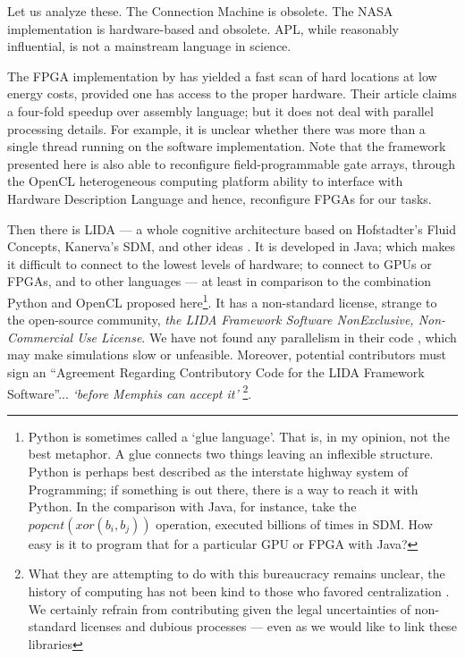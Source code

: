 Let us analyze these.  The Connection Machine is obsolete.  The NASA implementation is hardware-based and obsolete.  APL, while reasonably influential, is not a mainstream language in science.

The FPGA implementation by \citet{silva_reconfigurable_2004} has yielded a fast scan of hard locations at low energy costs, provided one has access to the proper hardware. Their article claims a four-fold speedup over assembly language; but it does not deal with parallel processing details.  For example, it is unclear whether there was more than a single thread running on the software implementation.  Note that the framework presented here is also able to reconfigure field-programmable gate arrays, through the OpenCL heterogeneous computing platform ability to interface with Hardware Description Language and hence, reconfigure FPGAs \citep{waidyasooriya2018design, czajkowski_opencl_2012} for our tasks.

Then there is LIDA --- a whole cognitive architecture based on Hofstadter's Fluid Concepts, Kanerva's SDM, and other ideas \citep{Anwar2003, snaider_integer_2013, snaider_modular_2014, franklin_lida:_2014}.  It is developed in Java; which makes it difficult to connect to the lowest levels of hardware; to connect to GPUs or FPGAs, and to other languages --- at least in comparison to the combination Python and OpenCL proposed here\footnote{Python is sometimes called a `glue language'. That is, in my opinion, not the best metaphor.  A glue connects two things leaving an inflexible structure.  Python is perhaps best described as the interstate highway system of Programming; if something is out there, there is a way to reach it with Python.  In the comparison with Java, for instance, take the $popcnt(xor(b_i,b_j))$ operation, executed billions of times in SDM. How easy is it to program that for a particular GPU or FPGA with Java?}.  It has a non-standard license, strange to the open-source community, \emph{the LIDA Framework Software NonExclusive, Non-Commercial Use License}.  We have not found any parallelism in their code \citep{ccrg_ccrg_nodate}, which may make simulations slow or unfeasible. Moreover, potential contributors must sign an ``Agreement Regarding Contributory Code for the LIDA Framework Software''... \emph{`before Memphis can accept it'} \footnote{What they are attempting to do with this bureaucracy remains unclear, the history of computing has not been kind to those who favored centralization \citep{ferguson_computer_2002}.  We certainly refrain from contributing given the legal uncertainties of non-standard licenses and dubious processes --- even as we would like to link these libraries}.

